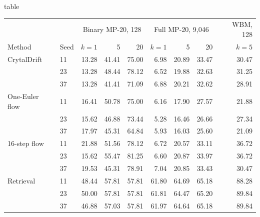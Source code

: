 \begin{inplace}{table}\centering\small
\caption{Raw recovery by fitted seed and number of draws. Entries are percentages of all targets in the indicated cohort. The binary and full MP-20 columns refer to separately trained networks and separately selected target sets. WBM uses its own formula-disjoint training split. Retrieval seeds index its sampled donors.}\label{t:seed-results}
\begin{tabular}{llrrrrrrr}\hline
 & & \multicolumn{3}{c}{Binary MP-20, 128} & \multicolumn{3}{c}{Full MP-20, 9,046} & WBM, 128\\
Method & Seed & $k{=}1$ & 5 & 20 & $k{=}1$ & 5 & 20 & $k{=}5$\\\hline
CrytalDrift & 11 & 13.28 & 41.41 & 75.00 & 6.98 & 20.89 & 33.47 & 30.47 \\
 & 23 & 13.28 & 48.44 & 78.12 & 6.52 & 19.88 & 32.63 & 31.25 \\
 & 37 & 13.28 & 41.41 & 71.09 & 6.88 & 20.21 & 32.62 & 28.91 \\
\hline
One-Euler flow & 11 & 16.41 & 50.78 & 75.00 & 6.16 & 17.90 & 27.57 & 21.88 \\
 & 23 & 15.62 & 46.88 & 73.44 & 5.28 & 16.46 & 26.66 & 27.34 \\
 & 37 & 17.97 & 45.31 & 64.84 & 5.93 & 16.03 & 25.60 & 21.09 \\
\hline
16-step flow & 11 & 21.88 & 51.56 & 78.12 & 6.72 & 20.57 & 33.11 & 36.72 \\
 & 23 & 15.62 & 55.47 & 81.25 & 6.60 & 20.87 & 33.97 & 36.72 \\
 & 37 & 19.53 & 45.31 & 78.91 & 7.04 & 20.85 & 33.43 & 30.47 \\
\hline
Retrieval & 11 & 48.44 & 57.81 & 57.81 & 61.80 & 64.69 & 65.18 & 88.28 \\
 & 23 & 50.00 & 57.81 & 57.81 & 61.81 & 64.47 & 65.20 & 89.84 \\
 & 37 & 46.88 & 57.03 & 57.81 & 61.97 & 64.64 & 65.18 & 89.84 \\
\hline
\end{tabular}\end{inplace}
